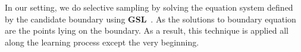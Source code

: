 
 



In our setting, %
we do selective sampling by solving the equation system defined by the candidate boundary using \textbf{GSL}~\cite{gough2009gnu}.
As the solutions to boundary equation are the points lying on the boundary. 
As a result, this technique is applied all along the learning process except the very beginning.

